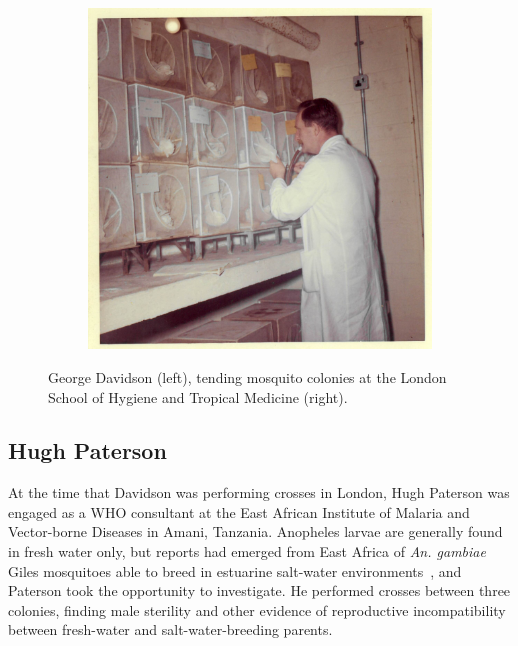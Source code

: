 \begin{refsection}
\begin{figure}[t]
\begin{subfigure}[t]{0.57\textwidth}
\includegraphics[width=1\textwidth,center]{artwork/chapter2/davidson-colonies.jpeg}
\end{subfigure}
\caption{George Davidson (left), tending mosquito colonies at the London School of Hygiene and Tropical Medicine (right).}
\label{fig:davidson}
\end{figure}


\subsection{Hugh Paterson}\label{subsec:hugh-paterson}

At the time that Davidson was performing crosses in London, Hugh Paterson was engaged as a WHO consultant at the East African Institute of Malaria and Vector-borne Diseases in Amani, Tanzania.
%
Anopheles larvae are generally found in fresh water only, but reports had emerged from East Africa of \textit{An. gambiae} Giles mosquitoes able to breed in estuarine salt-water environments~\parencite{DeMeillon1947,MuirheadThomson1948}, and Paterson took the opportunity to investigate.
%
He performed crosses between three colonies, finding male sterility and other evidence of reproductive incompatibility between fresh-water and salt-water-breeding parents.


\end{refsection}

